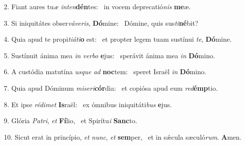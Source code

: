 2. Fiant aures tu\textit{æ} \textit{in}\textit{ten}\textbf{dén}tes: \ast\  in vocem deprecatió\textit{nis} \textbf{me}æ.\

3. Si iniquitátes obser\textit{vá}\textit{ve}\textit{ris}, \textbf{Dó}mine: \ast\  Dómine, quis sus\textit{ti}\textbf{né}bit?\

4. Quia apud te propi\textit{ti}\textit{á}\textit{ti}\textbf{o} est: \ast\  et propter legem tuam sustínui \textit{te}, \textbf{Dó}mine.\

5. Sustínuit ánima mea \textit{in} \textit{ver}\textit{bo} \textbf{e}jus: \ast\  sperávit ánima mea \textit{in} \textbf{Dó}mino.\

6. A custódia matutína \textit{us}\textit{que} \textit{ad} \textbf{noc}tem: \ast\  speret Israël \textit{in} \textbf{Dó}mino.\

7. Quia apud Dóminum \textit{mi}\textit{se}\textit{ri}\textbf{cór}dia: \ast\  et copiósa apud eum \textit{red}\textbf{émp}tio.\

8. Et ipse \textit{réd}\textit{i}\textit{met} \textbf{Is}raël: \ast\  ex ómnibus iniquitáti\textit{bus} \textbf{e}jus.\

9. Glória \textit{Pa}\textit{tri}, \textit{et} \textbf{Fí}lio, \ast\  et Spirítu\textit{i} \textbf{Sanc}to.\

10. Sicut erat in princípio, \textit{et} \textit{nunc}, \textit{et} \textbf{sem}per, \ast\  et in sǽcula sæculó\textit{rum}. \textbf{A}men.\

